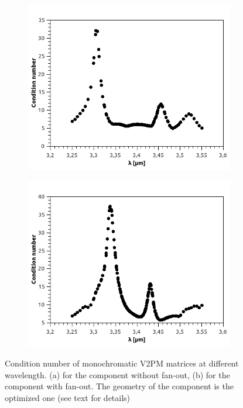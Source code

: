\begin{figure}
    \centering
    \begin{subfigure}{.45\textwidth}
        \centering
        \includegraphics[scale=.45]{picture/cond_BW/nofan.png}
        \subcaption{}
    \end{subfigure}%
    \hspace{.5cm}
    \begin{subfigure}{.45\textwidth}
        \centering
        \includegraphics[scale=.45]{picture/cond_BW/fanout.png}
        \subcaption{}
    \end{subfigure}
    \caption{Condition number of monochromatic V2PM matrices at different wavelength. (a) for the component without fan-out, (b) for the component with fan-out. The geometry of the component is the optimized one (see text for details)}
    \label{fig:cond_mono_multi}
\end{figure}



